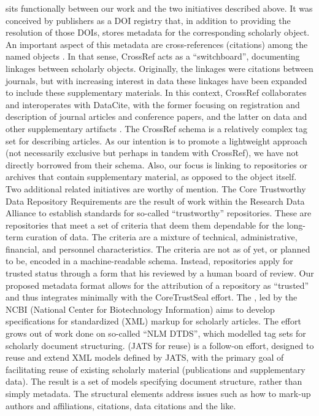   sits functionally between our work and the two initiatives described above.  It was conceived by publishers as a DOI registry that, in addition to providing the resolution of those DOIs, stores metadata for the corresponding scholarly object.  An important aspect of this metadata are cross-references (citations) among the named objects \parencite{CrossRefRelationshipsDOIsother}.  In that sense, CrossRef acts as a ``switchboard'', documenting linkages between scholarly objects. Originally, the linkages were citations between journals, but with increasing interest in data these linkages have been expanded to include these supplementary materials.  In this context, CrossRef collaborates and interoperates with DataCite, with the former focusing on registration and description of journal articles and conference papers, and the latter on data and other supplementary artifacts .  The CrossRef schema is a relatively complex tag set for describing articles.  As our intention is to promote a lightweight approach (not necessarily exclusive but perhaps in tandem with CrossRef), we have not directly borrowed from their schema.  Also, our focus is linking to repositories or archives that contain supplementary material, as opposed to the object itself.
Two additional related initiatives are worthy of mention.   The Core Trustworthy Data Repository Requirements \parencite{CoreTrustSealDataRepositoriesRequirements2017} are the result of work within the Research Data Alliance to establish standards for so-called ``trustworthy'' repositories.  These are repositories that meet a set of criteria that deem them dependable for the long-term curation of data.  The criteria are a mixture of technical, administrative, financial, and personnel characteristics.  The criteria are not as of yet, or planned to be, encoded in a machine-readable schema.  Instead, repositories apply for trusted status through a form that his reviewed by a human board of review.  Our proposed metadata format allows for the attribution of a repository as ``trusted'' and thus integrates minimally with the CoreTrustSeal effort.
The , led by the NCBI (National Center for Biotechnology Information) aims to develop specifications for standardized (XML) markup for scholarly articles.  The effort grows out of work done on so-called ``NLM DTDS'', which modelled tag sets for scholarly document structuring.   (JATS for reuse) is a follow-on effort, designed to reuse and extend XML models defined by JATS, with the primary goal of facilitating reuse of existing scholarly material (publications and supplementary data). The result is a set of models specifying document structure, rather than simply metadata.  The structural elements address issues such as how to mark-up authors and affiliations, citations, data citations and the like.